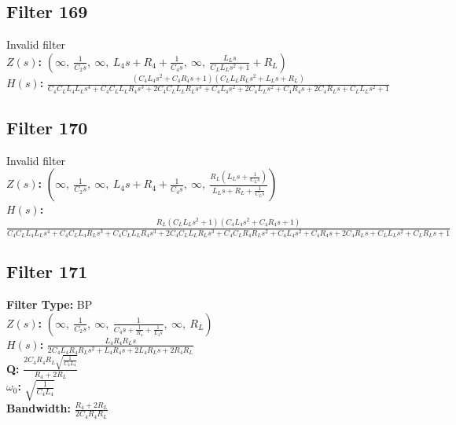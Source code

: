 \documentclass{article}
\begin{document}
\subsection*{Filter 169}
Invalid filter \\ 
\textbf{$Z(s)$:} $\left( \infty, \  \frac{1}{C_{2} s}, \  \infty, \  L_{4} s + R_{4} + \frac{1}{C_{4} s}, \  \infty, \  \frac{L_{L} s}{C_{L} L_{L} s^{2} + 1} + R_{L}\right)$ \\ 
\textbf{$H(s)$:} $\frac{\left(C_{4} L_{4} s^{2} + C_{4} R_{4} s + 1\right) \left(C_{L} L_{L} R_{L} s^{2} + L_{L} s + R_{L}\right)}{C_{4} C_{L} L_{4} L_{L} s^{4} + C_{4} C_{L} L_{L} R_{4} s^{3} + 2 C_{4} C_{L} L_{L} R_{L} s^{3} + C_{4} L_{4} s^{2} + 2 C_{4} L_{L} s^{2} + C_{4} R_{4} s + 2 C_{4} R_{L} s + C_{L} L_{L} s^{2} + 1}$ \\ 
\subsection*{Filter 170}
Invalid filter \\ 
\textbf{$Z(s)$:} $\left( \infty, \  \frac{1}{C_{2} s}, \  \infty, \  L_{4} s + R_{4} + \frac{1}{C_{4} s}, \  \infty, \  \frac{R_{L} \left(L_{L} s + \frac{1}{C_{L} s}\right)}{L_{L} s + R_{L} + \frac{1}{C_{L} s}}\right)$ \\ 
\textbf{$H(s)$:} $\frac{R_{L} \left(C_{L} L_{L} s^{2} + 1\right) \left(C_{4} L_{4} s^{2} + C_{4} R_{4} s + 1\right)}{C_{4} C_{L} L_{4} L_{L} s^{4} + C_{4} C_{L} L_{4} R_{L} s^{3} + C_{4} C_{L} L_{L} R_{4} s^{3} + 2 C_{4} C_{L} L_{L} R_{L} s^{3} + C_{4} C_{L} R_{4} R_{L} s^{2} + C_{4} L_{4} s^{2} + C_{4} R_{4} s + 2 C_{4} R_{L} s + C_{L} L_{L} s^{2} + C_{L} R_{L} s + 1}$ \\ 
\subsection*{Filter 171}
\textbf{Filter Type:} BP \\ 
\textbf{$Z(s)$:} $\left( \infty, \  \frac{1}{C_{2} s}, \  \infty, \  \frac{1}{C_{4} s + \frac{1}{R_{4}} + \frac{1}{L_{4} s}}, \  \infty, \  R_{L}\right)$ \\ 
\textbf{$H(s)$:} $\frac{L_{4} R_{4} R_{L} s}{2 C_{4} L_{4} R_{4} R_{L} s^{2} + L_{4} R_{4} s + 2 L_{4} R_{L} s + 2 R_{4} R_{L}}$ \\ 
\textbf{Q:} $\frac{2 C_{4} R_{4} R_{L} \sqrt{\frac{1}{C_{4} L_{4}}}}{R_{4} + 2 R_{L}}$ \\ 
\textbf{$\omega_0$:} $\sqrt{\frac{1}{C_{4} L_{4}}}$ \\ 
\textbf{Bandwidth:} $\frac{R_{4} + 2 R_{L}}{2 C_{4} R_{4} R_{L}}$ \\ 
\end{document}
